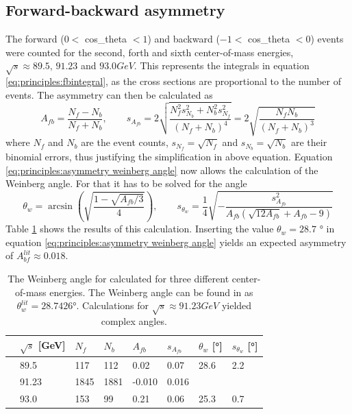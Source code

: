 \subsection{Forward-backward asymmetry}
The forward ($0<$ cos\_theta $<1$) and backward ($-1<$ cos\_theta $<0$) events were counted for the second, forth and sixth center-of-mass energies, $\sqrt{s}\approx89.5\text{, }91.23$ and $\unit{93.0}{GeV}$. This represents the integrals in equation \ref{eq:principles:fbintegral}, as the cross sections are proportional to the number of events. The asymmetry can then be calculated as
\begin{equation}
A_{fb}=\frac{N_f-N_b}{N_f+N_b},\qquad s_{A_{fb}}=2\sqrt{\frac{N_f^2s_{N_b}^2+N_b^2s_{N_f}^2}{(N_f+N_b)^4}}=2\sqrt{\frac{N_fN_b}{(N_f+N_b)^3}}
\end{equation}
where $N_f$ and $N_b$ are the event counts, $s_{N_f}=\sqrt{N_f}$ and $s_{N_b}=\sqrt{N_b}$ are their binomial errors, thus justifying the simplification in above equation. 
Equation \ref{eq:principles:asymmetry weinberg angle} now allows the calculation of the Weinberg angle. For that it has to be solved for the angle
\begin{equation}
\theta_w=\arcsin(\sqrt{\frac{1-\sqrt{A_{fb}/3}}{4}}),\qquad s_{\theta_w}=\frac{1}{4}\sqrt{-\frac{s_{A_{fb}}^2}{A_{fb}(\sqrt{12A_{fb}}+A_{fb}-9)}}
\end{equation}
Table \ref{tb:weinbergangle} shows the results of this calculation. Inserting the value $\theta_w=28.7$ ° \cite{Grif} in equation \ref{eq:principles:asymmetry weinberg angle} yields an expected asymmetry of $A_{bf}^{lit}\approx0.018$.\\
\begin{table}[h]\centering
	\begin{tabular}{@{}llllllll@{}}
		\toprule
		&$\sqrt{s}$ [GeV]&$N_f$&$N_b$&$A_{fb}$&$s_{A_{fb}}$&$\theta_w$ [°]&$s_{\theta_w}$ [°]\\
		\midrule
		&89.5&117&112&0.02&0.07&28.6&2.2\\
		&91.23&1845&1881&-0.010&0.016&&\\
		&93.0&153&99&0.21&0.06&25.3&0.7\\
		\bottomrule
	\end{tabular}
	\caption[A\_{fb} and the Weinberg angle]{The Weinberg angle for calculated for three different center-of-mass energies. The Weinberg angle can be found in \cite{muenchen} as $\theta_w^{lit}=28.7426$°. Calculations for $\sqrt{s}\approx\unit{91.23}{GeV}$ yielded complex angles.}
	\label{tb:weinbergangle}
\end{table}
